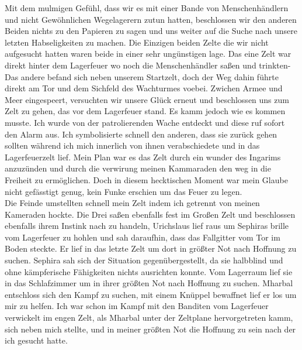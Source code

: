 \documentclass{book}
\begin{document}
    Mit dem mulmigen Gefühl, dass wir es mit einer Bande von Menschenhändlern und nicht Gewöhnlichen Wegelagerern zutun hatten, beschlossen wir den anderen Beiden nichts zu den Papieren zu sagen und uns weiter auf die Suche nach unsere letzten Habseligkeiten zu machen. Die Einzigen beiden Zelte die wir nicht aufgesucht hatten waren beide in einer sehr ungünstigen lage. Das eine Zelt war direkt hinter dem Lagerfeuer wo noch die Menschenhändler saßen und trinkten- Das andere befand sich neben unserem Startzelt, doch der Weg dahin führte direkt am Tor und dem Sichfeld des Wachturmes voebei. Zwichen Armee und Meer eingespeert, versuchten wir unsere Glück erneut und beschlossen uns zum Zelt zu gehen, das vor dem Lagerfeuer stand. Es kamm jedoch wie es kommen musste. Ich wurde von der patrolierenden Wache entdeckt und diese ruf sofort den Alarm aus. Ich symbolisierte schnell den anderen, dass sie zurück gehen sollten während ich mich innerlich von ihnen verabschiedete und in das Lagerfeuerzelt lief. Mein Plan war es das Zelt durch ein wunder des Ingarims anzuzünden und durch die verwirung meinen Kammaraden den weg in die Freiheit zu ermöglichen. Doch in diesem hecktischen Moment war mein Glaube nicht gefässtigt genug, kein Funke erschien um das Feuer zu legen.\\
    Die Feinde umstellten schnell mein Zelt indem ich getrennt von meinen Kameraden hockte. Die Drei saßen ebenfalls fest im Großen Zelt und beschlossen ebenfalls ihrem Instink nach zu handeln, Urichslaus lief raus um Sephiras brille vom Lagerfeuer zu hohlen und sah daraufhin, dass das Fallgitter vom Tor im Boden steckte. Er lief in das letzte Zelt um dort in größter Not nach Hoffnung zu suchen. Sephira sah sich der Situation gegenübergestellt, da sie halbblind und ohne kämpferische Fähigkeiten nichts ausrichten konnte. Vom Lagerraum lief sie in das Schlafzimmer um in ihrer größten Not nach Hoffnung zu suchen. Mharbal entschloss sich den Kampf zu suchen, mit einem Knüppel bewaffnet lief er los um mir zu helfen. Ich war schon im Kampf mit den Banditen vom Lagerfeuer verwickelt im engen Zelt, als Mharbal unter der Zeltplane hervorgetreten kamm, sich neben mich stellte, und in meiner größten Not die Hoffnung zu sein nach der ich gesucht hatte.\\
\end{document}
